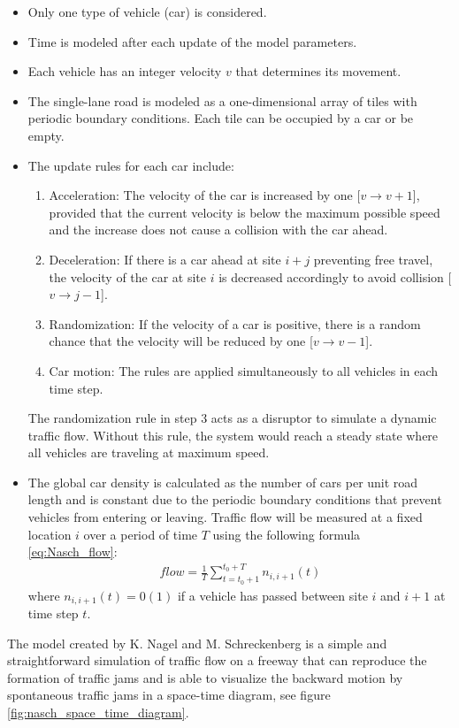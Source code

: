 \begin{itemize}
    \item Only one type of vehicle (car) is considered.
    \item Time is modeled after each update of the model parameters.
    \item Each vehicle has an integer velocity $v$ that determines its movement.
    \item The single-lane road is modeled as a one-dimensional array of tiles with periodic boundary conditions. Each tile can be occupied by a car or be empty. 
    \item The update rules for each car include: 
    \begin{enumerate}
        \item Acceleration:  The velocity of the car is increased by one [$v \rightarrow v + 1$], provided that the current velocity is below the maximum possible speed and the increase does not cause a collision with the car ahead. 
        \item Deceleration: If there is a car ahead at site $i + j$ preventing free travel, the velocity of the car at site $i$ is decreased accordingly to avoid collision [$v \rightarrow j - 1$].
        \item Randomization: If the velocity of a car is positive, there is a random chance that the velocity will be reduced by one [$v \rightarrow v - 1$]. 
        \item Car motion: The rules are applied simultaneously to all vehicles in each time step.
    \end{enumerate}
    The randomization rule in step 3 acts as a disruptor to simulate a dynamic traffic flow. Without this rule, the system would reach a steady state where all vehicles are traveling at maximum speed.
    \item The global car density is calculated as the number of cars per unit road length and is constant due to the periodic boundary conditions that prevent vehicles from entering or leaving. Traffic flow will be measured at a fixed location $i$ over a period of time $T$ using the following formula \ref{eq:Nasch_flow}:
    \begin{align}
        flow = \frac{1}{T}\sum_{t=t_{0} + 1}^{t_{0} + T}n_{i, i+1}(t)
        \label{eq:Nasch_flow}
    \end{align}
    where $n_{i, i+1}(t) = 0(1)$ if a vehicle has passed between site $i$  and $i+1$ at time step $t$.
\end{itemize}
The model created by K. Nagel and M. Schreckenberg is a simple and straightforward simulation of traffic flow on a freeway that can reproduce the formation of traffic jams and is able to visualize the backward motion by spontaneous traffic jams in a space-time diagram, see figure \ref{fig:nasch_space_time_diagram}. 

